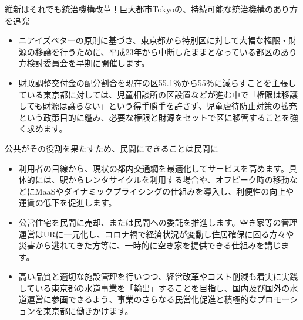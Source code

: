 \documentclass[dvipdfmx]{beamer}
\begin{document}
    \begin{frame}{維新はそれでも統治機構改革！}{巨大都市Tokyoの、持続可能な統治機構のあり方を追究}
        \begin{small}
            \begin{itemize}
                \setlength{\itemsep}{2mm}
                \item ニアイズベターの原則に基づき、東京都から特別区に対して大幅な権限・財源の移譲を行うために、平成23年から中断したままとなっている都区のあり方検討委員会を早期に開催します。
                \item 財政調整交付金の配分割合を現在の区55.1％から55％に減らすことを主張している東京都に対しては、児童相談所の区設置などが進む中で「権限は移譲しても財源は譲らない」という得手勝手を許さず、児童虐待防止対策の拡充という政策目的に鑑み、必要な権限と財源をセットで区に移管することを強く求めます。
            \end{itemize}
        \end{small}
    \end{frame}

    \begin{frame}{公共がその役割を果たすため、民間にできることは民間に}{}
        \begin{small}
            \begin{itemize}
                \setlength{\itemsep}{2mm}
                \item 利用者の目線から、現状の都内交通網を最適化してサービスを高めます。具体的には、駅からレンタサイクルを利用する場合や、オフピーク時の移動などにMaaSやダイナミックプライシングの仕組みを導入し、利便性の向上や運賃の低下を促進します。
                \item 公営住宅を民間に売却、または民間への委託を推進します。空き家等の管理運営はURに一元化し、コロナ禍で経済状況が変動し住居確保に困る方々や災害から逃れてきた方等に、一時的に空き家を提供できる仕組みを講じます。
                \item 高い品質と適切な施設管理を行いつつ、経営改革やコスト削減も着実に実践している東京都の水道事業を「輸出」することを目指し、国内及び国外の水道運営に参画できるよう、事業のさらなる民営化促進と積極的なプロモーションを東京都に働きかけます。
            \end{itemize}
        \end{small}
    \end{frame}
    
\end{document}
